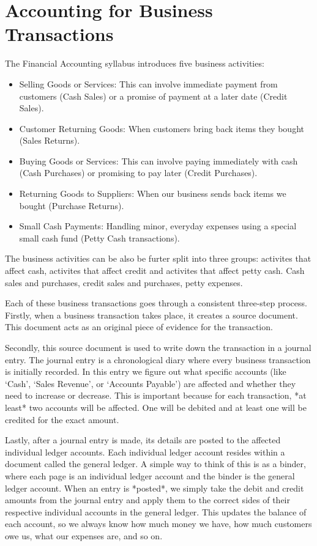 \section{Accounting for Business Transactions}



The Financial Accounting syllabus introduces five business activities:

\begin{itemize}
    \item Selling Goods or Services: This can involve immediate payment from customers (Cash Sales) or a promise of payment at a later date (Credit Sales). 
    \item Customer Returning Goods: When customers bring back items they bought (Sales Returns).   
    \item Buying Goods or Services:  This can involve paying immediately with cash (Cash Purchases) or promising to pay later (Credit Purchases). 
    \item Returning Goods to Suppliers: When our business sends back items we bought (Purchase Returns). 
    \item Small Cash Payments: Handling minor, everyday expenses using a special small cash fund (Petty Cash transactions). 
\end{itemize}

The business activities can be also be furter split into three groups: activites that affect cash, activites that affect credit and activites that affect petty cash. Cash sales and purchases, credit sales and purchases, petty expenses. 

Each of these business transactions goes through a consistent three-step process. Firstly, when a business transaction takes place, it creates a source document. This document acts as an original piece of evidence for the transaction. 

Secondly, this source document is used to write down the transaction in a journal entry. The journal entry is a chronological diary where every business transaction is initially recorded. In this entry we figure out what specific accounts (like `Cash', `Sales Revenue', or `Accounts Payable') are affected and whether they need to increase or decrease.  This is important because for each transaction, *at least* two accounts will be affected. One will be debited and at least one will be credited for the exact amount. 

Lastly, after a journal entry is made, its details are posted to the affected individual ledger accounts. Each individual ledger account resides within a document called the general ledger. A simple way to think of this is as a binder, where each page is an individual ledger account and the binder is the general ledger account. When an entry is *posted*, we simply take the debit and credit amounts from the journal entry and apply them to the correct sides of their respective individual accounts in the general ledger. This updates the balance of each account, so we always know how much money we have, how much customers owe us, what our expenses are, and so on.




